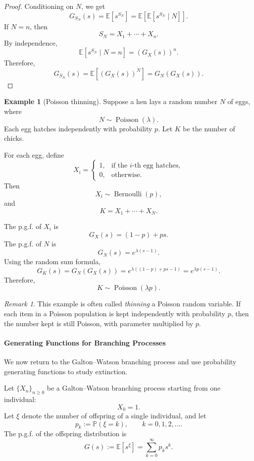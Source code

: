 \documentclass[11pt]{article}
\theoremstyle{plain}
\theoremstyle{definition}
\newtheorem{example}[theorem]{Example}
\theoremstyle{remark}
\newtheorem{remark}[theorem]{Remark}
\begin{document}
	\begin{proof}
		Conditioning on \(N\), we get
		\[
		G_{S_N}(s)
		=
		\mathbb{E}[s^{S_N}]
		=
		\mathbb{E}\left[\mathbb{E}[s^{S_N}\mid N]\right].
		\]
		If \(N=n\), then
		\[
		S_N=X_1+\cdots+X_n.
		\]
		By independence,
		\[
		\mathbb{E}[s^{S_N}\mid N=n]
		=
		(G_X(s))^n.
		\]
		Therefore,
		\[
		G_{S_N}(s)
		=
		\mathbb{E}\left[(G_X(s))^N\right]
		=
		G_N(G_X(s)).
		\]
	\end{proof}
	\begin{example}[Poisson thinning]
		Suppose a hen lays a random number \(N\) of eggs, where
		\[
		N\sim\operatorname{Poisson}(\lambda).
		\]
		Each egg hatches independently with probability \(p\). Let \(K\) be the number of chicks.
		
		For each egg, define
		\[
		X_i=
		\begin{cases}
			1, & \text{if the \(i\)-th egg hatches},\\
			0, & \text{otherwise}.
		\end{cases}
		\]
		Then
		\[
		X_i\sim\operatorname{Bernoulli}(p),
		\]
		and
		\[
		K=X_1+\cdots+X_N.
		\]
		
		The p.g.f. of \(X_i\) is
		\[
		G_X(s)=(1-p)+ps.
		\]
		The p.g.f. of \(N\) is
		\[
		G_N(s)=e^{\lambda(s-1)}.
		\]
		Using the random sum formula,
		\[
		G_K(s)
		=
		G_N(G_X(s))
		=
		e^{\lambda((1-p)+ps-1)}
		=
		e^{\lambda p(s-1)}.
		\]
		Therefore,
		\[
		K\sim\operatorname{Poisson}(\lambda p).
		\]
	\end{example}
	
	\begin{remark}
		This example is often called \emph{thinning} a Poisson random variable. If each item in a Poisson population is kept independently with probability \(p\), then the number kept is still Poisson, with parameter multiplied by \(p\).
	\end{remark}
	
	\paragraph{Generating Functions for Branching Processes}
	
	We now return to the Galton--Watson branching process and use probability generating functions to study extinction.
	
	Let \(\{X_n\}_{n\ge 0}\) be a Galton--Watson branching process starting from one individual:
	\[
	X_0=1.
	\]
	Let \(\xi\) denote the number of offspring of a single individual, and let
	\[
	p_k:=\mathbb{P}(\xi=k),
	\qquad k=0,1,2,\dots.
	\]
	The p.g.f. of the offspring distribution is
	\[
	G(s)
	:=
	\mathbb{E}[s^\xi]
	=
	\sum_{k=0}^{\infty}p_ks^k.
	\]
	
\end{document}
